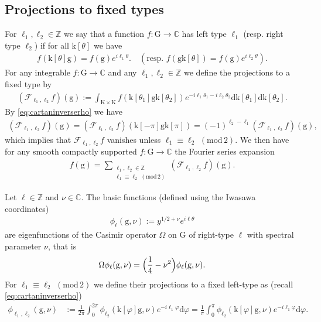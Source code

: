 \documentclass[12pt]{amsart}
\theoremstyle{definition}
\theoremstyle{remark}
\numberwithin{equation}{section}
\newcommand{\K}{\mathrm{K}}
\newcommand{\G}{\mathrm{G}}
\newcommand{\C}{{\mathbb C}}
\newcommand{\Z}{{\mathbb Z}}
\newcommand{\1}{{\mathbf 1}}
\renewcommand{\k}{\mathrm{k}}
\newcommand{\g}{\mathrm{g}}
\renewcommand{\d}{\mathrm d}
\renewcommand{\pmod}[1]{\,\,(\mathrm{mod}\,{#1})}
\begin{document}
\subsection{Projections to fixed types}
For $\ell_1,\ell_2 \in \Z$  we say that a function $f:\G \to\C$ has left type $\ell_1$ (resp. right type $\ell_2$) if for all $\k[\theta]$ we have
\begin{align*}
    f(\k[\theta] \g ) = f(\g) e^{i\ell_1 \theta}. \quad (\text{resp. }  f(\g \k[\theta]) = f(\g) e^{ i\ell_2 \theta}).
\end{align*}
For any integrable $f:\G\to\C$ and any $\ell_1,\ell_2 \in \Z$ we define the projections to a fixed type by
\begin{align*}
(\mathcal{F}_{\ell_1,\ell_2} f) (\g) := \int_{\K \times \K} f(\k[\theta_1] \g \k[\theta_2])  e^{-i \ell_1 \theta_1 - i \ell_2 \theta_2} \d \k[\theta_1] \d \k[\theta_2].
\end{align*}
By \eqref{eq:cartaninverserho} we have
\begin{align*}
    (\mathcal{F}_{\ell_1,\ell_2} f) (\g) =   (\mathcal{F}_{\ell_1,\ell_2} f) (\k[-\pi]\g\k[\pi]) =  (-1)^{\ell_2-\ell_1}(\mathcal{F}_{\ell_1,\ell_2} f) (\g),
\end{align*}
which implies that $  \mathcal{F}_{\ell_1,\ell_2} f$ vanishes unless $\ell_1\equiv \ell_2 \pmod{2}$.  We then have for any smooth compactly supported $f:\G \to \C$ the Fourier series expansion
\begin{align} \label{eq:fouriertypeexpansion}
    f(\g) = \sum_{\substack{\ell_1,\ell_2 \in \Z \\ \ell_1 \equiv \ell_2 \pmod{2}}}  (\mathcal{F}_{\ell_1,\ell_2} f)(\g).
\end{align}

Let $\ell \in \Z$ and $\nu \in \C$. The basic functions (defined using the Iwasawa coordinates)
\begin{align} \label{eq:phibasicdefinition}
    \phi_{\ell}(\g,\nu):=y^{1/2+\nu} e^{ i\ell \theta}
\end{align}
 are  eigenfunctions of the Casimir operator $\Omega$ on $\G$ of right-type $\ell$ with spectral parameter $\nu$, that is
\begin{align*}
    \Omega   \phi_{\ell}(\g,\nu) = \Bigl(\frac{1}{4}-\nu^2\Bigr) \phi_{\ell}(\g,\nu).
\end{align*}
For $\ell_1 \equiv \ell_2 \pmod{2}$ we define their projections to a fixed left-type as (recall \eqref{eq:cartaninverserho})
\begin{align} \label{eq:2pitopi}
    \phi_{\ell_1,\ell_2}(\g,\nu) &:= \frac{1}{2 \pi} \int_0^{2\pi}   \phi_{\ell_2}(\k[\varphi]\g,\nu) e^{-i\ell_1 \varphi} \d \varphi = \frac{1}{ \pi} \int_0^{\pi}   \phi_{\ell_2}(\k[\varphi]\g,\nu) e^{-i\ell_1 \varphi} \d \varphi. 
\end{align}
\end{document}
